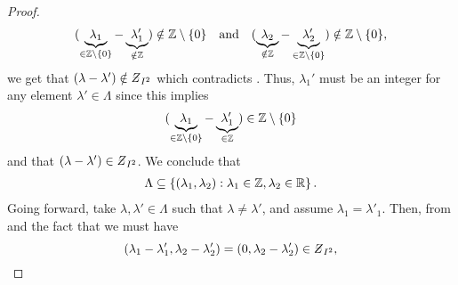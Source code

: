 \documentclass[../thesis.tex]{subfiles}
\begin{document}
\begin{proof}
\begin{align*}
        (\underbrace{\lambda_1}_{\in \mathbb{Z}\setminus\{0\}}-\underbrace{\lambda_1'}_{\notin \mathbb{Z}}) \notin \mathbb{Z}\setminus\{0\}
        \quad \text{and} \quad
        (\underbrace{\lambda_2}_{\notin \mathbb{Z}}-\underbrace{\lambda_2'}_{\in \mathbb{Z}\setminus\{0\}}) \notin \mathbb{Z}\setminus\{0\},
    \end{align*}
    we get that $\brac{\lambda-\lambda'} \notin \Zstroke_{I^2}$ which contradicts . Thus, $\lambda_1'$ must be an integer for any element $\lambda'\in \Lambda$ since this implies
    \begin{align*}  %
        \brac{\underbrace{\lambda_1}_{\in \intnozero}-\underbrace{\lambda_1'}_{\in \Z}} \in \intnozero
    \end{align*}
    and that $\brac{\lambda-\lambda'} \in \Zstroke_{I^2}$. We conclude that %
    \begin{align*}  %
        \Lambda \subseteq \braqMed{ \bracMed{\lambda_1, \lambda_2} : \lambda_1 \in \Z, \lambda_2 \in \R}.
    \end{align*}
    Going forward, take $\lambda, \lambda' \in \Lambda$ such that $\lambda\neq \lambda'$, and assume $\lambda_1 = \lambda'_1$. Then, from  and the fact that we must have  %
    \begin{equation*}
        \brac{\lambda_1-\lambda'_1,\lambda_2-\lambda'_2} = \brac{0,\lambda_2-\lambda'_2}\in \Zstroke_{I^2},
    \end{equation*}

\end{proof}
\end{document}
